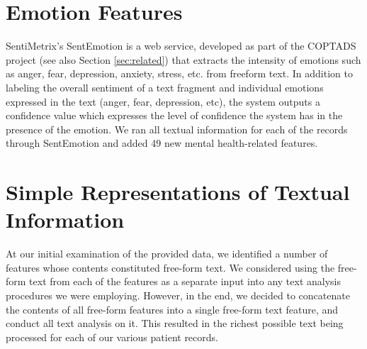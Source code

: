  \section{Emotion Features} SentiMetrix's SentEmotion is a web service,
 developed as part of the COPTADS project \cite{coptads,coptads-book} (see also Section \ref{sec:related}) that extracts the intensity of emotions such as anger, fear, depression, anxiety, stress, etc. from freeform text. In addition to labeling the overall sentiment of a text fragment
\cite{subrahmanian2008ava} and individual emotions expressed in the
 text (anger,  fear, depression, etc),  the system outputs a confidence value which expresses
 the level of confidence the system has in the presence of the emotion.
 We ran all textual information for each of the records through SentEmotion and
 added 49 new mental health-related features.
 
 
\section{Simple Representations of Textual Information}
 At our initial examination of the provided data, we identified a number of features
 whose contents constituted free-form text. We considered using the free-form text from each of the features as a separate input into any text analysis procedures we were employing.
 However, in the end, we decided to concatenate the contents of all free-form features into a single free-form text feature, and conduct all text analysis on it. This resulted in the richest possible text being processed for each of our various patient records. 
 
